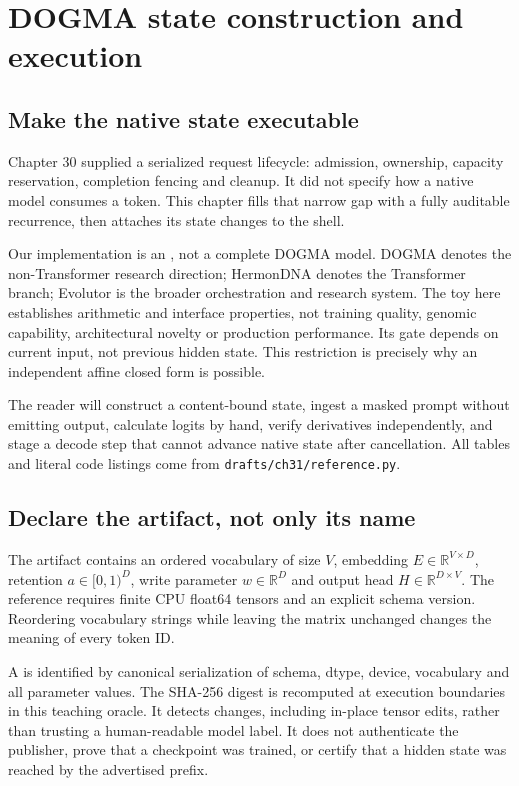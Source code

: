 \chapter{DOGMA state construction and execution}
\label{ch:evo31}
\section{Make the native state executable}
Chapter 30 supplied a serialized request lifecycle: admission, ownership,
capacity reservation, completion fencing and cleanup. It did not specify how
a native model consumes a token. This chapter fills that narrow gap with a
fully auditable recurrence, then attaches its state changes to the shell.

Our implementation is an , not a complete
DOGMA model. DOGMA denotes the non-Transformer research direction; HermonDNA
denotes the Transformer branch; Evolutor is the broader orchestration and research
system. The toy here establishes arithmetic and interface properties, not
training quality, genomic capability, architectural novelty or production
performance. Its gate depends on current input, not previous hidden state.
This restriction is precisely why an independent affine closed form is possible.

The reader will construct a content-bound state, ingest a masked prompt without
emitting output, calculate logits by hand, verify derivatives independently,
and stage a decode step that cannot advance native state after cancellation.
All tables and literal code listings come from
\texttt{drafts/ch31/reference.py}.

\section{Declare the artifact, not only its name}
The artifact contains an ordered vocabulary of size $V$, embedding
$E\in\mathbb R^{V\times D}$, retention $a\in[0,1)^D$, write parameter
$w\in\mathbb R^D$ and output head $H\in\mathbb R^{D\times V}$.
The reference requires finite CPU float64 tensors and an explicit schema version.
Reordering vocabulary strings while leaving the matrix unchanged changes the
meaning of every token ID.

A  is identified by canonical serialization of
schema, dtype, device, vocabulary and all parameter values. The SHA-256 digest
is recomputed at execution boundaries in this teaching oracle.
It detects changes, including in-place tensor edits, rather than trusting a
human-readable model label. It does not authenticate the publisher, prove that
a checkpoint was trained, or certify that a hidden state was reached by the
advertised prefix.

